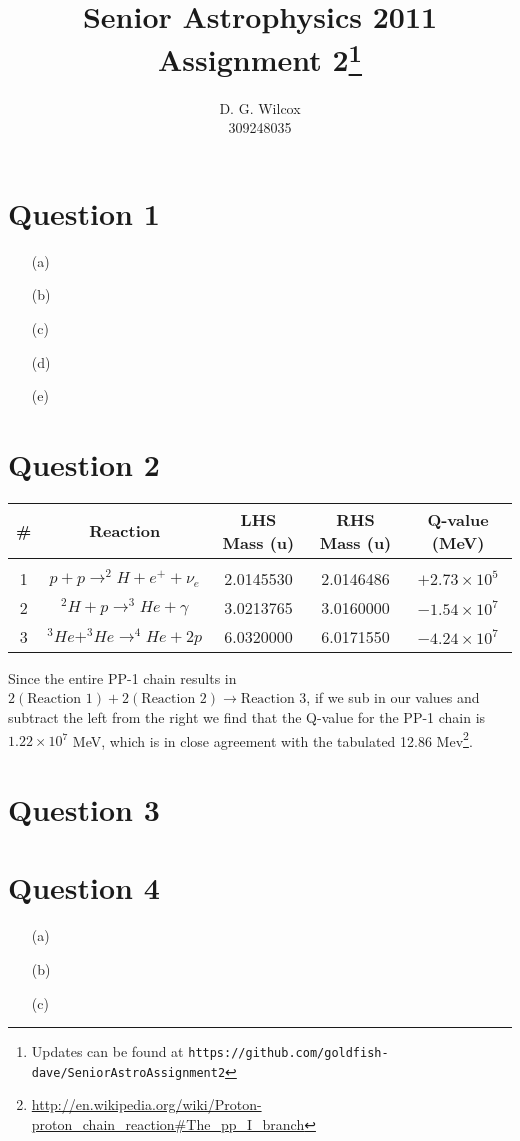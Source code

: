\documentclass[10pt,a4paper]{article}
\title{Senior Astrophysics 2011 Assignment 2\footnote{Updates can be found at \texttt{https://github.com/goldfish-dave/SeniorAstroAssignment2}}}
\date{}
\author{D. G. Wilcox \\
		309248035}
\begin{document}
\maketitle

\section*{Question 1}
\begin{itemize}
    \item[(a)]
    \item[(b)]
    \item[(c)]
    \item[(d)]
    \item[(e)]
\end{itemize}
\section*{Question 2}
\newcommand{\reactionOne}{$p + p \rightarrow ^{2}H + e^{+} + \nu_{e}$}
\newcommand{\reactionTwo}{$^{2}H + p \rightarrow ^{3}He + \gamma$}
\newcommand{\reactionThree}{$^{3}He + ^{3}He \rightarrow ^{4}He + 2p$}

\newcommand{\qvalueOne}{$+2.73 \times 10^{5}$}
\newcommand{\qvalueTwo}{$-1.54 \times 10^{7}$}
\newcommand{\qvalueThree}{$-4.24 \times 10^{7}$}

\begin{table}[h]
    \begin{tabular}{c|c|c|c|c}
        \#   &   Reaction            &   LHS Mass   (u)    &   RHS Mass (u)    &   Q-value (MeV) \\
        \hline \\
        1    &   \reactionOne{}      &   2.0145530         &   2.0146486       &   \qvalueOne{}  \\
        2    &   \reactionTwo{}      &   3.0213765         &   3.0160000       &   \qvalueTwo{}  \\
        3    &   \reactionThree{}    &   6.0320000         &   6.0171550       &   \qvalueThree{} \\
    \end{tabular}
\end{table}
Since the entire PP-1 chain results in $2(\mbox{Reaction } 1) + 2(\mbox{Reaction } 2) \rightarrow \mbox{Reaction } 3$, if we sub in our values and subtract the left from the right we find that the Q-value for the PP-1 chain is $1.22 \times 10^{7}$ MeV, which is in close agreement with the tabulated 12.86 Mev\footnote{\url{http://en.wikipedia.org/wiki/Proton-proton_chain_reaction#The_pp_I_branch}}.
\section*{Question 3}
\section*{Question 4}
\begin{itemize}
    \item[(a)]
    \item[(b)]
    \item[(c)]
\end{itemize}
\end{document}
